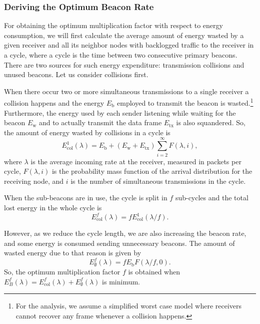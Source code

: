 \documentclass[journal,english,twocolumn,10pt,letterpaper]{IEEEtran}
\begin{document}
\subsubsection{Deriving the Optimum Beacon Rate}
\label{sec:sett-corr-beac}

For obtaining the optimum multiplication factor with respect to energy
consumption, we will first calculate the average amount of energy wasted by a
given receiver and all its neighbor nodes with backlogged traffic to the
receiver in a cycle, where a cycle is the time between two consecutive primary
beacons. There are two sources for such energy expenditure: transmission
collisions and unused beacons. Let us consider collisions first.

When there occur two or more simultaneous transmissions to a single receiver a
collision happens and the energy $E_{\mathrm{b}}$ employed to transmit the
beacon is wasted.\footnote{For the analysis, we assume a simplified worst case
  model where receivers cannot recover any frame whenever a collision
  happens.} Furthermore, the energy used by each sender listening while
waiting for the beacon $E_{\mathrm{w}}$ and to actually transmit the data
frame $E_{\mathrm{tx}}$ is also squandered. So, the amount of energy wasted by
collisions in a cycle is
\begin{equation}
  \label{eq:ecol-1}
  E^1_{\mathrm{col}}(\lambda) = E_{\mathrm{b}} + (E_{\mathrm{w}}+E_{\mathrm{tx}})
  \sum_{i=2}^\infty F(\lambda, i),
\end{equation}
where $\lambda$ is the average incoming rate at the receiver, measured in
packets per cycle, $F(\lambda, i)$ is the probability mass function of the
arrival distribution for the receiving node, and $i$ is the number of
simultaneous transmissions in the cycle.

When the sub-beacons are in use, the cycle is split in $f$ sub-cycles and
the total lost energy in the whole cycle is
\begin{equation}
  \label{eq:ecol-f}
  E^f_{\mathrm{col}}(\lambda) = f E^1_{\mathrm{col}}(\lambda/f).
\end{equation}

However, as we reduce the cycle length, we are also increasing the beacon
rate, and some energy is consumed sending unnecessary beacons. The amount of
wasted energy due to that reason is given by
\begin{equation}
  \label{eq:e-unused-beacon}
  E^f_{\emptyset}(\lambda) = f E_{\mathrm{b}} F(\lambda/f, 0).
\end{equation}
So, the optimum multiplication factor $f$ is obtained when
$E^f_B(\lambda) = E^f_{\mathrm{col}}(\lambda) + E^f_{\emptyset}(\lambda)$ is
minimum.
\end{document}
